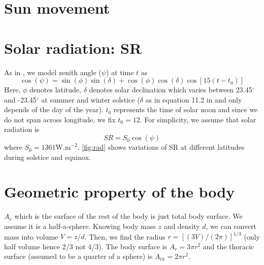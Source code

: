 \documentclass[12pt]{article}
\begin{document}
\maketitle 

\section{Sun movement}
\section*{Solar radiation: SR}
As in \citet{Campbell2012}, we model zenith angle ($\psi$) at time $t$ as
\begin{equation}  \label{eq:psi}
\cos(\psi) = \sin(\phi) \sin(\delta) + \cos(\phi) \cos(\delta) \cos[15 (t- t_0)] 
\end{equation}
Here, $\phi$ denotes latitude, $\delta$ denotes solar declination which varies between 23.45$^\circ$ and  -23.45$^\circ$ at summer and winter solstice 
($\delta$ as in equation 11.2 in \citet{Campbell2012} and only depends of the day of the year). 
$t_0$ represents the time of solar noon and since we do not span across longitude, we fix $t_0 = 12$.
For simplicity, we assume that solar radiation is \[SR = S_0 \cos(\psi) \] where $S_0 = 1361 \mbox{W.m}^{-2}$. 
\cref{fig:rad} shows variations of SR at different latitudes during solstice and equinox.


\section{Geometric property of the body}
$A_r$ which is the surface of the rest of the body is just total body surface.
We assume it is a half-a-sphere.
Knowing body mass $z$ and density $d$, we can convert mass into volume $ V = z/d$.
Then, we find the radius $r = [(3V)/(2 \pi)]^{1/3}$ (only half volume hence 2/3 not 4/3).
The body surface is   $A_r = 3 \pi r^2$ and the thoracic surface (assumed to be a quarter of a sphere) is $A_{th} = 2 \pi r^2$. 
\end{document}
